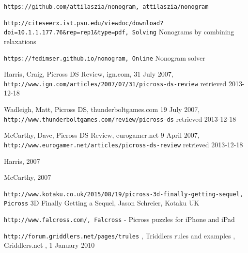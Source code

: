 \begin{thebibliography}{9}
\texttt{https://github.com/attilaszia/nonogram, attilaszia/nonogram}

\texttt{http://citeseerx.ist.psu.edu/viewdoc/download?doi=10.1.1.177.76\&rep=rep1\&type=pdf, Solving} Nonograms by combining relaxations

\texttt{https://fedimser.github.io/nonogram, Online} Nonogram solver

Harris, Craig, Picross DS Review, ign.com, 31 July 2007, \texttt{http://www.ign.com/articles/2007/07/31/picross-ds-review} retrieved 2013-12-18

Wadleigh, Matt, Picross DS, thunderboltgames.com 19 July 2007, \texttt{http://www.thunderboltgames.com/review/picross-ds} retrieved 2013-12-18

McCarthy, Dave, Picross DS Review, eurogamer.net 9 April 2007, \texttt{http://www.eurogamer.net/articles/picross-ds-review}  retrieved 2013-12-18

Harris, 2007

McCarthy, 2007

\texttt{http://www.kotaku.co.uk/2015/08/19/picross-3d-finally-getting-sequel, Picross} 3D Finally Getting a Sequel, Jason Schreier, Kotaku UK

\texttt{http://www.falcross.com/, Falcross} - Picross puzzles for iPhone and iPad

\texttt{http://forum.griddlers.net/pages/trules} , Triddlers rules and examples , Griddlers.net , 1 January 2010

\end{thebibliography}